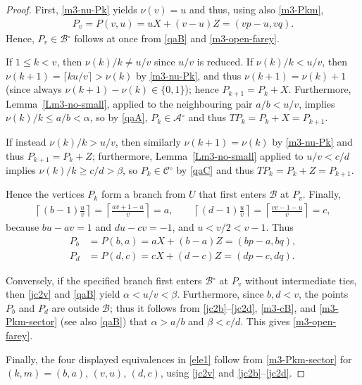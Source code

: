 \documentclass[11pt,reqno,tbtags,a4paper]{amsart}
\numberwithin{equation}{section}
\renewcommand\le{\leq}
\renewcommand\ge{\geq}
\renewcommand\leq{\leqslant}
\renewcommand\geq{\geqslant}
\theoremstyle{plain}%
\theoremstyle{definition}
\theoremstyle{remark}
\newcommand\set[1]{\ensuremath{\{#1\}}}
\newcommand\ceil[1]{\lceil#1\rceil}
\newcommand\inter{\ensuremath{^\circ}}
\newcommand\cA{\mathcal A}
\newcommand\cB{\mathcal B}
\newcommand\cC{\mathcal C}
\newcommand\0{{\boldsymbol 0}}
\newcommand\1{{\boldsymbol 1}}
\begin{document}
\begin{proof}
First, \eqref{m3-nu-Pk} yields $\nu(v)=u$ and thus,
using also \eqref{m3-Pkm},
\begin{align}\label{jc2v}
  P_v=P(v,u)=uX+(v-u)Z=(vp-u,vq).
\end{align}
Hence, $P_v\in\cB\inter$ follows at once from
\eqref{qaB} and \eqref{m3-open-farey}.

If
$1\le k<v$, then $\nu(k)/k\ne u/v$ since $u/v$ is reduced. 
If $\nu(k)/k<u/v$, then $\nu(k+1)=\ceil{ku/v}>\nu(k)$
by \eqref{m3-nu-Pk},
and thus $\nu(k+1)=\nu(k)+1$ (since always $\nu(k+1)-\nu(k)\in\set{0,1}$);
hence $P_{k+1}=P_k+X$.
Furthermore, 
Lemma~\ref{Lm3-no-small}, applied to the neighbouring pair $a/b<u/v$,
implies $\nu(k)/k\le a/b<\alpha$, so 
by \eqref{qaA}, 
$P_k\in\cA\inter$ and thus $TP_k = P_k+X=P_{k+1}$.

If instead $\nu(k)/k>u/v$, then similarly $\nu(k+1)=\nu(k)$
by \eqref{m3-nu-Pk}
and thus $P_{k+1}=P_k+Z$; 
furthermore, 
Lemma~\ref{Lm3-no-small} applied to $u/v<c/d$
implies
$\nu(k)/k\ge c/d>\beta$, so 
$P_k\in\cC\inter$ by \eqref{qaC} and  thus $TP_k = P_k+Z=P_{k+1}$.

Hence the vertices $P_k$ form a
branch from $U$ that first enters $\cB$ at $P_v$.  Finally,
\begin{align}\label{jc1}
 \left\lceil (b-1)\frac uv\right\rceil
=
 \left\lceil \frac{av+1-u}v\right\rceil
=a,
 \qquad
 \left\lceil (d-1)\frac uv\right\rceil
= \left\lceil \frac {cv-1-u}v\right\rceil
=c,
\end{align}
because $bu-av=1$ and $du-cv=-1$, and $u<v/2<v-1$.  
Thus
\begin{align}
\label{jc2b}
  P_b&=P(b,a)= aX+(b-a)Z=(bp-a,bq),
\\\label{jc2d}
  P_d&=P(d,c)=  cX+(d-c)Z=(dp-c,dq).
\end{align}

Conversely, if the specified branch first enters $\cB\inter$ at $P_v$
without intermediate ties, then 
\eqref{jc2v} and \eqref{qaB} yield $\alpha<u/v<\beta$. 
Furthermore, since $b,d<v$,
the points $P_b$ and $P_d$ are outside $\cB$; 
thus it follows from \eqref{jc2b}--\eqref{jc2d}, \eqref{m3-cB},
and \eqref{m3-Pkm-sector} (see also \eqref{qaB}) that
$\alpha>a/b$ and $\beta<c/d$. This gives
\eqref{m3-open-farey}.

Finally, 
the four displayed equivalences in \eqref{ele1} follow from
\eqref{m3-Pkm-sector} for $(k,m)=(b,a)$, $(v,u)$, $(d,c)$,
using \eqref{jc2v} and \eqref{jc2b}--\eqref{jc2d}.
\end{proof}
\end{document}
